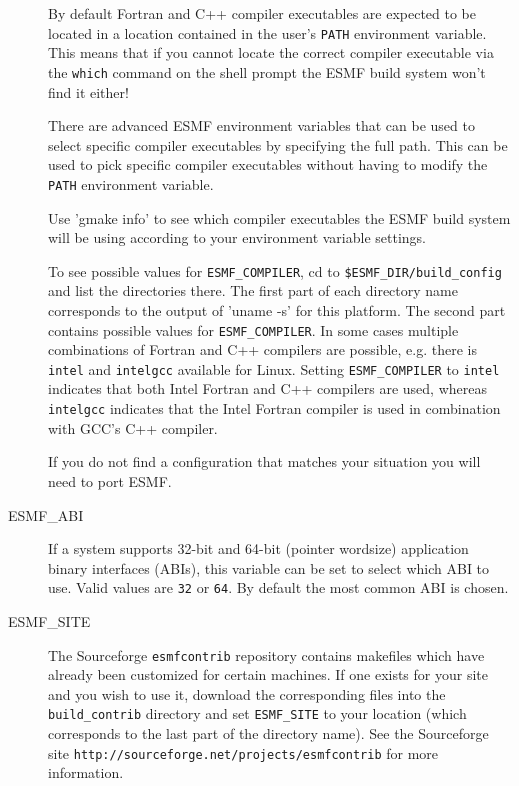 \begin{description}
By default Fortran and C++ compiler executables are expected to be located in
a location contained in the user's {\tt PATH} environment variable. This means
that if you cannot locate the correct compiler executable via the {\tt which}
command on the shell prompt the ESMF build system won't find it either!

There are advanced ESMF environment variables that can be used to select 
specific compiler executables by specifying the full path. This can be used to
pick specific compiler executables without having to modify the {\tt PATH}
environment variable.

Use 'gmake info' to see which compiler executables the ESMF build system will
be using according to your environment variable settings.

To see possible values for {\tt ESMF\_COMPILER}, cd to 
{\tt \$ESMF\_DIR/build\_config} and list the directories there. The first part 
of each directory name corresponds to the output of 'uname -s' for this 
platform. The second part contains possible values for {\tt ESMF\_COMPILER}. In
some cases multiple combinations of Fortran and C++ compilers are possible, e.g.
there is {\tt intel} and {\tt intelgcc} available for Linux. Setting 
{\tt ESMF\_COMPILER} to {\tt intel} indicates that both Intel Fortran and 
C++ compilers are used, whereas {\tt intelgcc} indicates that the Intel Fortran
compiler is used in combination with GCC's C++ compiler.

If you do not find a configuration that matches your situation you will need to
port ESMF.

\item[ESMF\_ABI]
If a system supports 32-bit and 64-bit (pointer wordsize) application binary
interfaces (ABIs), this variable can be set to select which ABI to use. Valid 
values are {\tt 32} or {\tt 64}. By default the most common ABI is chosen.

\item[ESMF\_SITE]
The Sourceforge {\tt esmfcontrib} repository contains makefiles which have 
already been customized for certain machines.  If one exists for your site 
and you wish to use it, download the corresponding files into the 
{\tt build\_contrib} directory and set {\tt ESMF\_SITE} to your location
(which corresponds to the last part of the directory name).  See the 
Sourceforge site {\tt http://sourceforge.net/projects/esmfcontrib} for more 
information.


\end{description}


